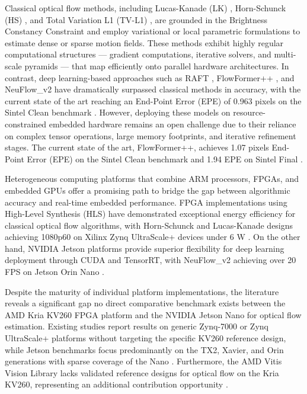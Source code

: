\documentclass[conference]{IEEEtran}
\begin{document}
Classical optical flow methods, including Lucas-Kanade (LK) \cite{ref40}, Horn-Schunck (HS) \cite{ref1}, and Total Variation L1 (TV-L1) \cite{ref17}, are grounded in the Brightness Constancy Constraint and employ variational or local parametric formulations to estimate dense or sparse motion fields. These methods exhibit highly regular computational structures --- gradient computations, iterative solvers, and multi-scale pyramids --- that map efficiently onto parallel hardware architectures. In contrast, deep learning-based approaches such as RAFT \cite{ref7}, FlowFormer++ \cite{ref10}, and NeuFlow\_v2 \cite{ref3} have dramatically surpassed classical methods in accuracy, with the current state of the art reaching an End-Point Error (EPE) of 0.963 pixels on the Sintel Clean benchmark \cite{ref10}. However, deploying these models on resource-constrained embedded hardware remains an open challenge due to their reliance on complex tensor operations, large memory footprints, and iterative refinement stages. The current state of the art, FlowFormer++, achieves 1.07 pixels End-Point Error (EPE) on the Sintel Clean benchmark and 1.94 EPE on Sintel Final \cite{ref10}.

Heterogeneous computing platforms that combine ARM processors, FPGAs, and embedded GPUs offer a promising path to bridge the gap between algorithmic accuracy and real-time embedded performance. FPGA implementations using High-Level Synthesis (HLS) have demonstrated exceptional energy efficiency for classical optical flow algorithms, with Horn-Schunck and Lucas-Kanade designs achieving 1080p60 on Xilinx Zynq UltraScale+ devices under 6 W \cite{ref1,ref13}. On the other hand, NVIDIA Jetson platforms provide superior flexibility for deep learning deployment through CUDA and TensorRT, with NeuFlow\_v2 achieving over 20 FPS on Jetson Orin Nano \cite{ref3}.

Despite the maturity of individual platform implementations, the literature reveals a significant gap no direct comparative benchmark exists between the AMD Kria KV260 FPGA platform and the NVIDIA Jetson Nano for optical flow estimation. Existing studies report results on generic Zynq-7000 or Zynq UltraScale+ platforms without targeting the specific KV260 reference design, while Jetson benchmarks focus predominantly on the TX2, Xavier, and Orin generations with sparse coverage of the Nano \cite{ref13,ref25}. Furthermore, the AMD Vitis Vision Library lacks validated reference designs for optical flow on the Kria KV260, representing an additional contribution opportunity \cite{ref6,ref17}.
\end{document}
